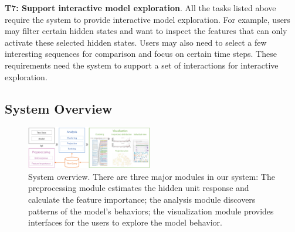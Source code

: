 \textbf{T7: Support interactive model exploration}.
All the tasks listed above require the system to provide interactive model exploration.
For example, users may filter certain hidden states and want to inspect the features that can only activate these selected hidden states.
Users may also need to select a few interesting sequences for comparison and focus on certain time steps.
These requirements need the system to support a set of interactions for interactive exploration.

\subsection{System Overview}

\begin{figure}[t]
	\centering
    \includegraphics[width=0.49\textwidth]{pictures/System_framework.pdf}
	\vspace{-3mm}
	\caption{System overview. There are three major modules in our system: The preprocessing module estimates the hidden unit response and calculate the feature importance; the analysis module discovers patterns of the model's behaviors; the visualization module provides interfaces for the users to explore the model behavior.}
	\label{fig:system_framework}
	\vspace{-4mm}
\end{figure}


